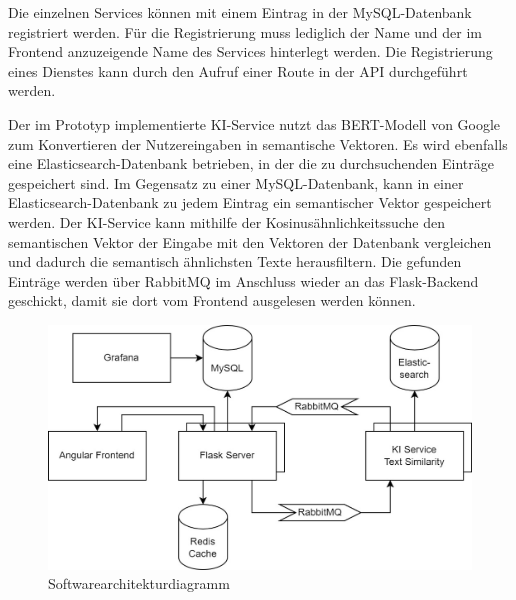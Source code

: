 Die einzelnen Services können mit einem Eintrag in der MySQL-Datenbank registriert werden. Für die Registrierung muss lediglich der Name und der im Frontend anzuzeigende Name des Services hinterlegt werden. Die Registrierung eines Dienstes kann durch den Aufruf einer Route in der API durchgeführt werden. 

Der im Prototyp implementierte KI-Service nutzt das BERT-Modell von Google zum Konvertieren der Nutzereingaben in semantische Vektoren. Es wird ebenfalls eine Elasticsearch-Datenbank betrieben, in der die zu durchsuchenden Einträge gespeichert sind. Im Gegensatz zu einer MySQL-Datenbank, kann in einer Elasticsearch-Datenbank zu jedem Eintrag ein semantischer Vektor gespeichert werden. Der KI-Service kann mithilfe der Kosinusähnlichkeitssuche den semantischen Vektor der Eingabe mit den Vektoren der Datenbank vergleichen und dadurch die semantisch ähnlichsten Texte herausfiltern. Die gefunden Einträge werden über RabbitMQ im Anschluss wieder an das Flask-Backend geschickt, damit sie dort vom Frontend ausgelesen werden können.

\begin{figure}[H]
  \centering
    \includegraphics[width = 12cm]{bilder/Architektur}
    \caption{Softwarearchitekturdiagramm}
\end{figure}

